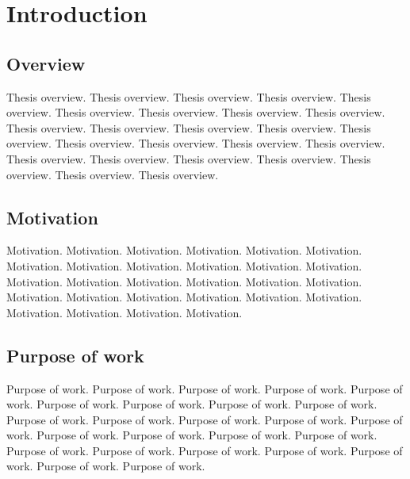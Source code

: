 
\chapter{Introduction}

\section{Overview}

Thesis overview. Thesis overview. Thesis overview. Thesis overview. Thesis overview.
Thesis overview. Thesis overview. Thesis overview. Thesis overview. Thesis overview.
Thesis overview. Thesis overview. Thesis overview. Thesis overview. Thesis overview.
Thesis overview. Thesis overview. Thesis overview. Thesis overview. Thesis overview.
Thesis overview. Thesis overview. Thesis overview. Thesis overview. Thesis overview.

\section{Motivation}

Motivation. Motivation. Motivation. Motivation. Motivation. Motivation. Motivation. 
Motivation. Motivation. Motivation. Motivation. Motivation. Motivation. Motivation. 
Motivation. Motivation. Motivation. Motivation. Motivation. Motivation. Motivation. 
Motivation. Motivation. Motivation. Motivation. Motivation. Motivation. Motivation. 

\section{Purpose of work}

Purpose of work. Purpose of work. Purpose of work. Purpose of work. Purpose of work.  
Purpose of work. Purpose of work. Purpose of work. Purpose of work. Purpose of work.  
Purpose of work. Purpose of work. Purpose of work. Purpose of work. Purpose of work.  
Purpose of work. Purpose of work. Purpose of work. Purpose of work. Purpose of work.  
Purpose of work. Purpose of work. Purpose of work. Purpose of work. Purpose of work.  
